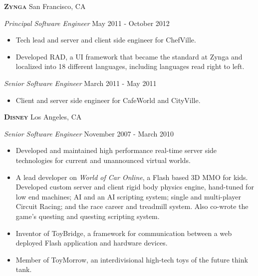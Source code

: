 \documentclass[a4paper]{article}
\begin{document}
\textbf{\textsc{Zynga}} \hfill San Francisco, CA\\
\vspace{2mm}

\begin{addmargin}[1em]{0em}

\textit{Principal Software Engineer} \hfill May 2011 - October 2012\\
\vspace{-1mm}
\begin{itemize} \itemsep 1pt
    \item Tech lead and server and client side engineer for ChefVille.
    \item Developed RAD, a UI framework that became the standard at Zynga and localized
    into 18 different languages, including languages read right to left.
\end{itemize}
\textit{Senior Software Engineer} \hfill March 2011 - May 2011\\
\vspace{-1mm}
\begin{itemize} \itemsep 1pt
    \item Client and server side engineer for CafeWorld and CityVille.
\end{itemize}
\end{addmargin}

\newpage

\textbf{\textsc{Disney}} \hfill Los Angeles, CA\\
\vspace{2mm}

\begin{addmargin}[1em]{0em}

\textit{Senior Software Engineer} \hfill November 2007 - March 2010\\
\vspace{-1mm}
\begin{itemize} \itemsep 1pt
    \item Developed and maintained high performance real-time server side
        technologies for current and unannounced virtual worlds.
    \item A lead developer on \textit{World of Car Online}, a Flash based 3D MMO for kids.
        Developed custom server and client rigid body physics engine, hand-tuned for low 
        end machines; AI and an AI scripting system; single and multi-player Circuit Racing;
        and the race career and treadmill system. Also co-wrote the game's questing and 
        questing scripting system.
    \item Inventor of ToyBridge, a framework for communication between a web 
        deployed Flash application and hardware devices.
    \item Member of ToyMorrow, an interdivisional high-tech toys of the future think 
        tank.
\end{itemize}

\end{addmargin}
\end{document}

